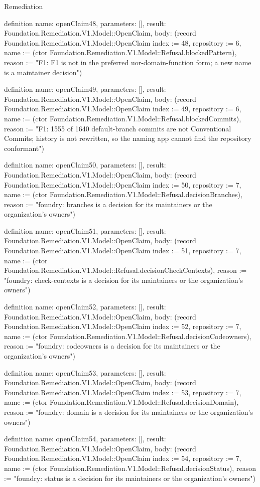 \begin{lexlean}{Remediation}
\begin{semanticmodule}
definition{
  name: openClaim48,
  parameters: [],
  result: Foundation.Remediation.V1.Model::OpenClaim,
  body: (record Foundation.Remediation.V1.Model::OpenClaim {index := 48, repository := 6, name := (ctor Foundation.Remediation.V1.Model::Refusal.blockedPattern), reason := "F1: F1 is not in the preferred uor-{domain}-{function} form; a new name is a maintainer decision"})
}

definition{
  name: openClaim49,
  parameters: [],
  result: Foundation.Remediation.V1.Model::OpenClaim,
  body: (record Foundation.Remediation.V1.Model::OpenClaim {index := 49, repository := 6, name := (ctor Foundation.Remediation.V1.Model::Refusal.blockedCommits), reason := "F1: 1555 of 1640 default-branch commits are not Conventional Commits; history is not rewritten, so the naming app cannot find the repository conformant"})
}

definition{
  name: openClaim50,
  parameters: [],
  result: Foundation.Remediation.V1.Model::OpenClaim,
  body: (record Foundation.Remediation.V1.Model::OpenClaim {index := 50, repository := 7, name := (ctor Foundation.Remediation.V1.Model::Refusal.decisionBranches), reason := "foundry: branches is a decision for its maintainers or the organization's owners"})
}

definition{
  name: openClaim51,
  parameters: [],
  result: Foundation.Remediation.V1.Model::OpenClaim,
  body: (record Foundation.Remediation.V1.Model::OpenClaim {index := 51, repository := 7, name := (ctor Foundation.Remediation.V1.Model::Refusal.decisionCheckContexts), reason := "foundry: check-contexts is a decision for its maintainers or the organization's owners"})
}

definition{
  name: openClaim52,
  parameters: [],
  result: Foundation.Remediation.V1.Model::OpenClaim,
  body: (record Foundation.Remediation.V1.Model::OpenClaim {index := 52, repository := 7, name := (ctor Foundation.Remediation.V1.Model::Refusal.decisionCodeowners), reason := "foundry: codeowners is a decision for its maintainers or the organization's owners"})
}

definition{
  name: openClaim53,
  parameters: [],
  result: Foundation.Remediation.V1.Model::OpenClaim,
  body: (record Foundation.Remediation.V1.Model::OpenClaim {index := 53, repository := 7, name := (ctor Foundation.Remediation.V1.Model::Refusal.decisionDomain), reason := "foundry: domain is a decision for its maintainers or the organization's owners"})
}

definition{
  name: openClaim54,
  parameters: [],
  result: Foundation.Remediation.V1.Model::OpenClaim,
  body: (record Foundation.Remediation.V1.Model::OpenClaim {index := 54, repository := 7, name := (ctor Foundation.Remediation.V1.Model::Refusal.decisionStatus), reason := "foundry: status is a decision for its maintainers or the organization's owners"})
}


\end{semanticmodule}
\end{lexlean}

